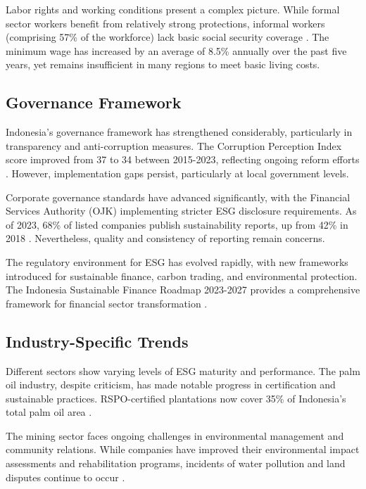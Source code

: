 Labor rights and working conditions present a complex picture. While formal sector workers benefit from relatively strong protections, informal workers (comprising 57\% of the workforce) lack basic social security coverage \cite{REF_ID}. The minimum wage has increased by an average of 8.5\% annually over the past five years, yet remains insufficient in many regions to meet basic living costs.

\subsection{Governance Framework}

Indonesia's governance framework has strengthened considerably, particularly in transparency and anti-corruption measures. The Corruption Perception Index score improved from 37 to 34 between 2015-2023, reflecting ongoing reform efforts \cite{REF_ID}. However, implementation gaps persist, particularly at local government levels.

Corporate governance standards have advanced significantly, with the Financial Services Authority (OJK) implementing stricter ESG disclosure requirements. As of 2023, 68\% of listed companies publish sustainability reports, up from 42\% in 2018 \cite{REF_ID}. Nevertheless, quality and consistency of reporting remain concerns.

The regulatory environment for ESG has evolved rapidly, with new frameworks introduced for sustainable finance, carbon trading, and environmental protection. The Indonesia Sustainable Finance Roadmap 2023-2027 provides a comprehensive framework for financial sector transformation \cite{REF_ID}.

\subsection{Industry-Specific Trends}

Different sectors show varying levels of ESG maturity and performance. The palm oil industry, despite criticism, has made notable progress in certification and sustainable practices. RSPO-certified plantations now cover 35\% of Indonesia's total palm oil area \cite{REF_ID}.

The mining sector faces ongoing challenges in environmental management and community relations. While companies have improved their environmental impact assessments and rehabilitation programs, incidents of water pollution and land disputes continue to occur \cite{REF_ID}.

